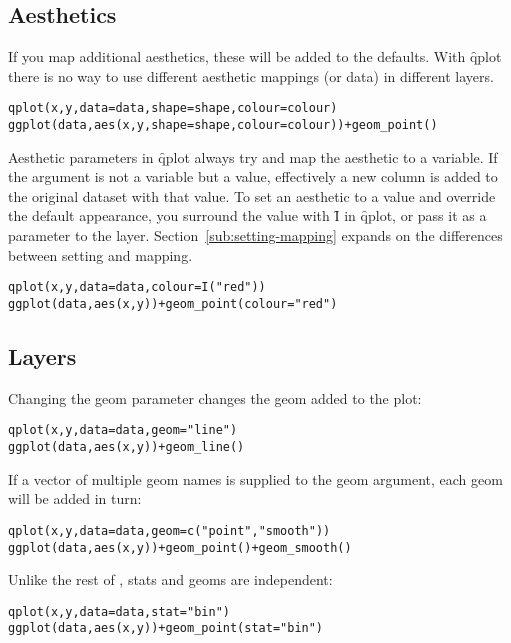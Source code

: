 \subsection{Aesthetics}

If you map additional aesthetics, these will be added to the defaults.  With \f{qplot} there is no way to use different aesthetic mappings (or data) in different layers.

\begin{alltt}
qplot(x, y, data = data, shape = shape, colour = colour)
ggplot(data, aes(x, y, shape = shape, colour = colour)) + geom_point()
\end{alltt}

Aesthetic parameters in \f{qplot} always try and map the aesthetic to a variable.  If the argument is not a variable but a value, effectively a new column is added to the original dataset with that value.  To set an aesthetic to a value and override the default appearance, you surround the value with \f{I} in \f{qplot}, or pass it as a parameter to the layer.  Section~\ref{sub:setting-mapping} expands on the differences between setting and mapping.

\begin{alltt}
qplot(x, y, data = data, colour = I("red"))
ggplot(data, aes(x, y)) + geom_point(colour = "red")
\end{alltt}

\subsection{Layers}

Changing the geom parameter changes the geom added to the plot:

\begin{alltt}
qplot(x, y, data = data, geom = "line")
ggplot(data, aes(x, y)) + geom_line()
\end{alltt}

If a vector of multiple geom names is supplied to the geom argument, each geom will be added in turn:

\begin{alltt}
qplot(x, y, data = data, geom = c("point", "smooth"))
ggplot(data, aes(x, y)) + geom_point() + geom_smooth()
\end{alltt}

Unlike the rest of \ggplot, stats and geoms are independent:

\begin{alltt}
qplot(x, y, data = data, stat = "bin")
ggplot(data, aes(x, y)) + geom_point(stat = "bin")  
\end{alltt}

